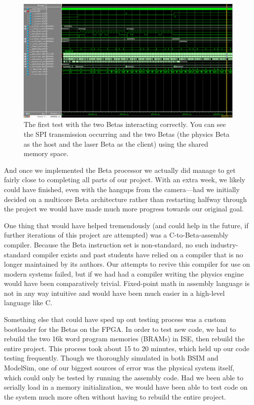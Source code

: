 \documentclass{article}
\begin{document}
\begin{figure}[h]
\centering
\includegraphics[width=\textwidth]{physics_laser_interact_test01}
\caption{The first test with the two Betas interacting correctly. You can see the SPI transmission occurring and the two Betas (the physics Beta as the host and the laser Beta as the client) using the shared memory space.}
\end{figure}

And once we implemented the Beta processor we actually did manage to get fairly close to completing all parts of our project. With an extra week, we likely could have finished, even with the hangups from the camera---had we initially decided on a multicore Beta architecture rather than restarting halfway through the project we would have made much more progress towards our original goal.

One thing that would have helped tremendously (and could help in the future, if further iterations of this project are attempted) was a C-to-Beta-assembly compiler. Because the Beta instruction set is non-standard, no such industry-standard compiler exists and past students have relied on a compiler that is no longer maintained by its authors. Our attempts to revive this compiler for use on modern systems failed, but if we had had a compiler writing the physics engine would have been comparatively trivial. Fixed-point math in assembly language is not in any way intuitive and would have been much easier in a high-level language like C.

Something else that could have sped up out testing process was a custom bootloader for the Betas on the FPGA. In order to test new code, we had to rebuild the two 16k word program memories (BRAMs) in ISE, then rebuild the entire project. This process took about 15 to 20 minutes, which held up our code testing frequently. Though we thoroughly simulated in both BSIM and ModelSim, one of our biggest sources of error was the physical system itself, which could only be tested by running the assembly code. Had we been able to serially load in a memory initialization, we would have been able to test code on the system much more often without having to rebuild the entire project.
\end{document}
